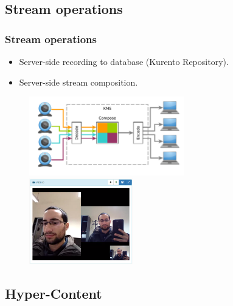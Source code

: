 \documentclass[compress]{beamer}
\begin{document}
\subsection{Stream operations}
	\begin{frame}[c]
		\frametitle{Stream operations}

		\begin{itemize}
			\item Server-side recording to database (Kurento Repository).
			\item Server-side stream composition.
		\end{itemize}


		\begin{figure}
			\includegraphics[width=0.6\textwidth]{figures/wcomposite.pdf}
			\includegraphics[width=0.4\textwidth]{figures/devices.png}
		\end{figure}
		\end{frame}


\subsection{Hyper-Content}
\end{document}
